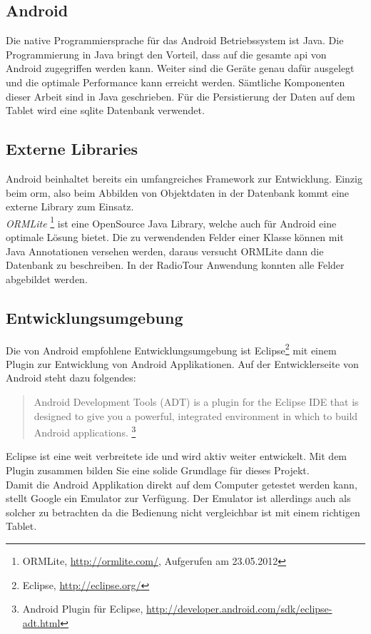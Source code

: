 \subsection{Android}
Die native Programmiersprache für das Android Betriebssystem ist Java. Die Programmierung in Java bringt den Vorteil, dass auf die gesamte \gls{api} von Android zugegriffen werden kann. Weiter sind die Geräte genau dafür ausgelegt und die optimale Performance kann erreicht werden. Sämtliche Komponenten dieser Arbeit sind in Java geschrieben. Für die Persistierung der Daten auf dem Tablet wird eine \gls{sqlite} Datenbank verwendet.

\subsection{Externe Libraries}
Android beinhaltet bereits ein umfangreiches Framework zur Entwicklung. Einzig beim \gls{orm}, also beim Abbilden von Objektdaten in der Datenbank kommt eine externe Library zum Einsatz.
\\
\textit{ORMLite} \footnote{ORMLite, \url{http://ormlite.com/}, Aufgerufen am 23.05.2012} ist eine OpenSource Java Library, welche auch für Android eine optimale Lösung bietet. Die zu verwendenden Felder einer Klasse können mit Java Annotationen versehen werden, daraus versucht ORMLite dann die Datenbank zu beschreiben. In der RadioTour Anwendung konnten alle Felder abgebildet werden.


\subsection{Entwicklungsumgebung}
Die von Android empfohlene Entwicklungsumgebung ist Eclipse\footnote{Eclipse, \url{http://eclipse.org/}} mit einem Plugin zur Entwicklung von Android Applikationen. Auf der Entwicklerseite von Android steht dazu folgendes:
\begin{quote}
\grqq Android Development Tools (ADT) is a plugin for the Eclipse IDE that is designed to give you a powerful, integrated environment in which to build Android applications.\grqq
\footnote{Android Plugin für Eclipse, \url{http://developer.android.com/sdk/eclipse-adt.html}}
\end{quote}
Eclipse ist eine weit verbreitete \gls{ide} und wird aktiv weiter entwickelt. Mit dem Plugin zusammen bilden Sie eine solide Grundlage für dieses Projekt.
\\
Damit die Android Applikation direkt auf dem Computer getestet werden kann, stellt Google ein Emulator zur Verfügung. Der Emulator ist allerdings auch als solcher zu betrachten da die Bedienung nicht vergleichbar ist mit einem richtigen Tablet.

